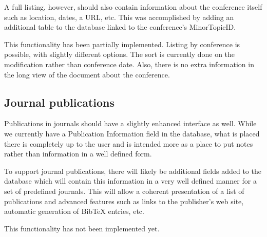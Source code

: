 \documentclass[12pt]{article}
\begin{document}
A full listing, however, should also contain information about the conference
itself such as location, dates, a URL, etc. This was accomplished by adding
an additional table to the database linked to the conference's MinorTopicID.

This functionality has been partially implemented. Listing by conference is
possible, with slightly different options. The sort is currently done on the
modification rather than conference date. Also, there is no extra information
in the long view of the document about the conference.

\subsection{Journal publications}

Publications in journals should have a slightly enhanced interface as well.
While we currently have a Publication Information field in the database, what is
placed there is completely up to the user and is intended more as a place to put
notes rather than information in a well defined form. 

To support journal publications, there will likely be additional fields added to
the database which will contain this information in a very well defined manner
for a set of predefined journals. This will allow a coherent presentation of a
list of publications and advanced features such as links to the publisher's web
site, automatic generation of BibTeX entries, etc.

This functionality has not been implemented yet.


                                                                                      
\end{document}
